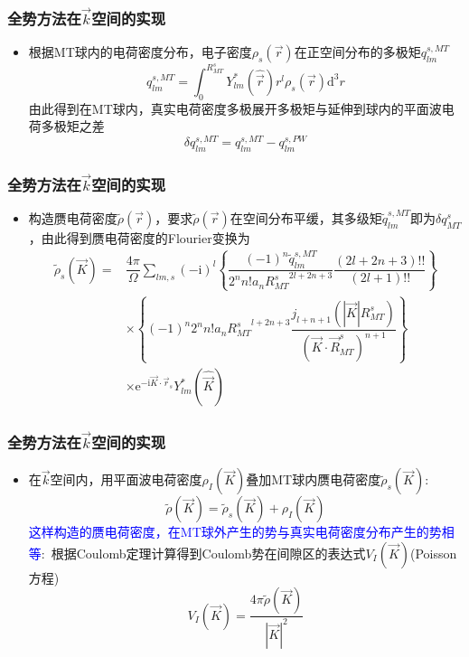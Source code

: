 \documentclass[cjk,slidestop,compress,mathserif,blue]{beamer}
\begin{document}
\frame
{
	\frametitle{全势方法在$\vec k$空间的实现}
\begin{itemize}
	\item 根据\textrm{MT}球内的电荷密度分布，电子密度$\rho_s(\vec r)$在正空间分布的多极矩$q_{lm}^{s,MT}$
\begin{displaymath}
	q_{lm}^{s,MT}=\int_0^{R_{MT}^s}Y_{lm}^{\ast}(\hat{\vec r})r^l\rho_s(\vec r)\mathrm{d}^3r
\end{displaymath}
由此得到在\textrm{MT}球内，真实电荷密度多极展开多极矩与延伸到球内的平面波电荷多极矩之差
	\begin{displaymath}
		\delta q_{lm}^{s,MT}=q_{lm}^{s,MT}-q_{lm}^{s,PW}
	\end{displaymath}
\end{itemize}
}

\frame
{
	\frametitle{全势方法在$\vec k$空间的实现}
\begin{itemize}
	\item 构造赝电荷密度$\tilde\rho(\vec r)$，要求$\tilde\rho(\vec r)$在空间分布平缓，其多级矩$\tilde q_{lm}^{s,MT}$即为$\delta q_{MT}^s$，由此得到赝电荷密度的\textrm{Flourier}变换为
	\begin{displaymath}
		\begin{aligned}
			\tilde\rho_s(\vec K)=&\dfrac{4\pi}{\Omega}\sum_{lm,s}(-\mathrm{i})^l\left\{\dfrac{(-1)^n\tilde q_{lm}^{s,MT}}{2^nn!a_n{R_{MT}^s}^{2l+2n+3}}\dfrac{(2l+2n+3)!!}{(2l+1)!!}\right\}\\
			&\times\left\{(-1)^n2^nn!a_n{R_{MT}^s}^{l+2n+3}\dfrac{j_{l+n+1}(|\vec K|R_{MT}^s)}{(\vec K\cdot\vec R_{MT}^s)^{n+1}}\right\}\\
			&\times\mathrm{e}^{\mathrm{-i}\vec K\cdot\vec r_s}Y_{lm}^{\ast}(\hat{\vec K})
		\end{aligned}
	\end{displaymath}
\end{itemize}
}

\frame
{
	\frametitle{全势方法在$\vec k$空间的实现}
\begin{itemize}
	\item 在$\vec k$空间内，用平面波电荷密度$\rho_I(\vec K)$叠加\textrm{MT}球内赝电荷密度$\tilde\rho_s(\vec K)$:
		\begin{displaymath}
			\tilde\rho(\vec K)=\tilde\rho_s(\vec K)+\rho_I(\vec K)
		\end{displaymath}
		\textcolor{blue}{这样构造的赝电荷密度，在\textrm{MT}球外产生的势与真实电荷密度分布产生的势相等}:~根据\textrm{Coulomb}定理计算得到\textrm{Coulomb}势在间隙区的表达式$V_I(\vec K)$(\textrm{Poisson}方程)
		\begin{displaymath}
			V_I(\vec K)=\dfrac{4\pi\tilde\rho(\vec K)}{|\vec K|^2}
		\end{displaymath}
\end{itemize}
}
\end{document}
